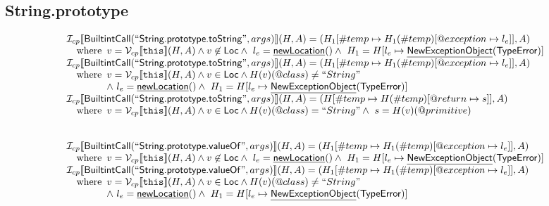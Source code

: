\documentclass{article}
\makeatletter
\newcommand{\SF}[1]{\mbox{\textsf{#1}}}
\newcommand{\TT}[1]{\mbox{\texttt{#1}}}
\newcommand{\wherec}[1]{{\rm where}\begin{array}[t]{l}#1\end{array}}
\newcommand{\I}{\mathcal{I}}
\newcommand{\V}{\mathcal{V}}
\newcommand{\lbr}{\llbracket}
\newcommand{\rbr}{\rrbracket}
\newcommand{\hf}[1]{\underline{\sf #1}}
\newcommand{\varloc}[1]{\##1}
\newcommand{\varprop}[1]{@#1}
\makeatother
\begin{document}
\subsection{String.prototype}
\[
\begin{array}{l}
\I _{cp}\lbr \SF{BuiltintCall}(``\SF{String.prototype.toString}",args)\rbr(H,A)
 = (H_1[\varloc{temp}\mapsto H_1(\varloc{temp})[\varprop{exception}\mapsto l_e]], A) \\
\quad\wherec{
  v = \V _{cp}\lbr \TT{this}\rbr (H,A) \land v \not\in \SF{Loc}
  \land\ l_e = \hf{newLocation}() \land\ H_1=H[l_e\mapsto\hf{NewExceptionObject}(\SF{TypeError})] 
  }\\
  
\I _{cp}\lbr \SF{BuiltintCall}(``\SF{String.prototype.toString}",args)\rbr(H,A)
 = (H_1[\varloc{temp}\mapsto H_1(\varloc{temp})[\varprop{exception}\mapsto l_e]], A) \\
\quad\wherec{
  v = \V _{cp}\lbr \TT{this}\rbr (H,A) \land v \in \SF{Loc} \land H(v)(@class) \neq ``String"\\
  \land\ l_e = \hf{newLocation}() \land\ H_1=H[l_e\mapsto\hf{NewExceptionObject}(\SF{TypeError})] 
  }\\
  
\I _{cp}\lbr \SF{BuiltintCall}(``\SF{String.prototype.toString}",args)\rbr(H,A)
 = (H[\varloc{temp}\mapsto H(\varloc{temp})[\varprop{return}\mapsto s]], A) \\
\quad\wherec{ 
  v = \V _{cp}\lbr \TT{this}\rbr (H,A) \land v \in \SF{Loc} \land H(v)(@class) = ``String"
  \land\ s = H(v)(\varprop{primitive})
  }\\
\\\\


\I _{cp}\lbr \SF{BuiltintCall}(``\SF{String.prototype.valueOf}",args)\rbr(H,A)
 = (H_1[\varloc{temp}\mapsto H_1(\varloc{temp})[\varprop{exception}\mapsto l_e]], A) \\
\quad\wherec{
  v = \V _{cp}\lbr \TT{this}\rbr (H,A) \land v \not\in \SF{Loc}
  \land\ l_e = \hf{newLocation}() \land\ H_1=H[l_e\mapsto\hf{NewExceptionObject}(\SF{TypeError})] 
  }\\
  
\I _{cp}\lbr \SF{BuiltintCall}(``\SF{String.prototype.valueOf}",args)\rbr(H,A)
 = (H_1[\varloc{temp}\mapsto H_1(\varloc{temp})[\varprop{exception}\mapsto l_e]], A) \\
\quad\wherec{
  v = \V _{cp}\lbr \TT{this}\rbr (H,A) \land v \in \SF{Loc} \land H(v)(@class) \neq ``String"\\
  \land\ l_e = \hf{newLocation}() \land\ H_1=H[l_e\mapsto\hf{NewExceptionObject}(\SF{TypeError})] 
  }\\
  

\end{array}\]
\end{document}
